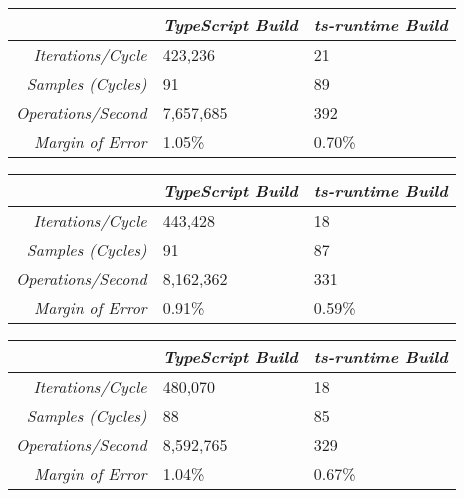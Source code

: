 \begin{center}
{
\centering
\tabulinesep=1.2mm
\setlength{\tabcolsep}{5mm}
\def\arraystretch{1.25}
\small
\begin{tabu} to \textwidth {|r||X[c,m]|X[c,m]|}
  \hline
  & \emph{TypeScript Build} & \emph{ts-runtime Build} \\
  \hline
  \hline
  \emph{Iterations/Cycle}  & 423,236 & 21 \\
  \hline
  \emph{Samples (Cycles)}  & 91 & 89 \\
  \hline
  \emph{Operations/Second} & 7,657,685 & 392 \\
  \hline
  \emph{Margin of Error}   & 1.05\% & 0.70\% \\
  \hline
\end{tabu}
}
\end{center}

\begin{center}
{
\centering
\tabulinesep=1.2mm
\setlength{\tabcolsep}{5mm}
\def\arraystretch{1.25}
\small
\begin{tabu} to \textwidth {|r||X[c,m]|X[c,m]|}
  \hline
  & \emph{TypeScript Build} & \emph{ts-runtime Build} \\
  \hline
  \hline
  \emph{Iterations/Cycle}  & 443,428 & 18 \\
  \hline
  \emph{Samples (Cycles)}  & 91 & 87 \\
  \hline
  \emph{Operations/Second} & 8,162,362 & 331 \\
  \hline
  \emph{Margin of Error}   & 0.91\% & 0.59\% \\
  \hline
\end{tabu}
}
\end{center}

\begin{center}
{
\centering
\tabulinesep=1.2mm
\setlength{\tabcolsep}{5mm}
\def\arraystretch{1.25}
\small
\begin{tabu} to \textwidth {|r||X[c,m]|X[c,m]|}
  \hline
  & \emph{TypeScript Build} & \emph{ts-runtime Build} \\
  \hline
  \hline
  \emph{Iterations/Cycle}  & 480,070 & 18 \\
  \hline
  \emph{Samples (Cycles)}  & 88 & 85 \\
  \hline
  \emph{Operations/Second} & 8,592,765 & 329 \\
  \hline
  \emph{Margin of Error}   & 1.04\% & 0.67\% \\
  \hline
\end{tabu}
}
\end{center}

